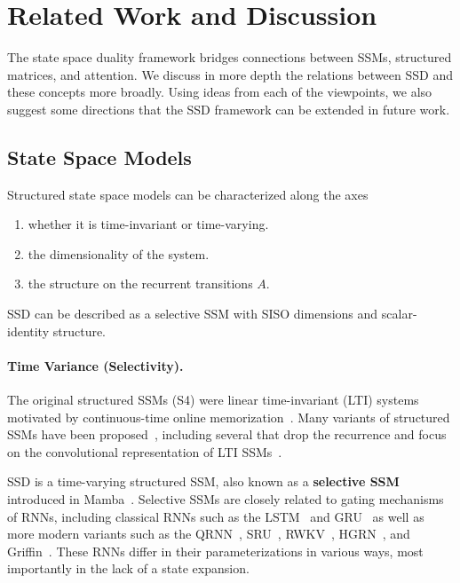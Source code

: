 \section{Related Work and Discussion}
\label{sec:related}


The state space duality framework bridges connections between SSMs, structured matrices, and attention.
We discuss in more depth the relations between SSD and these concepts more broadly.
Using ideas from each of the viewpoints, we also suggest some directions that the SSD framework can be extended in future work.

\subsection{State Space Models}
\label{sec:related:ssm}

Structured state space models can be characterized along the axes
\begin{enumerate}[label=(\roman*)]
  \item whether it is time-invariant or time-varying.
  \item the dimensionality of the system.
  \item the structure on the recurrent transitions $A$.
\end{enumerate}
SSD can be described as a selective SSM with SISO dimensions and scalar-identity structure.

\paragraph{Time Variance (Selectivity).}
The original structured SSMs (S4) were linear time-invariant (LTI) systems~\citep{gu2023thesis,gu2022efficiently} motivated by continuous-time online memorization~\citep{gu2020hippo,gu2021combining,gu2023train}.
Many variants of structured SSMs have been proposed~\citep{gupta2022diagonal,gu2022parameterization,smith2023s5,ma2023mega,dao2023hungry}, including several that drop the recurrence and focus on the convolutional representation of LTI SSMs~\citep{li2023makes,poli2023hyena,fu2023simple,qin2023toeplitz}.

SSD is a time-varying structured SSM, also known as a \textbf{selective SSM} introduced in Mamba~\citep{gu2023mamba}.
Selective SSMs are closely related to gating mechanisms of RNNs, including classical RNNs such as the LSTM~\citep{lstm} and GRU~\citep{chung2014empirical} as well as more modern variants such as the QRNN~\citep{bradbury2016quasi}, SRU~\citep{lei2017simple,lei2021attention}, RWKV~\citep{peng2023rwkv}, HGRN~\citep{qin2023hierarchically}, and Griffin~\citep{de2024griffin,botev2024recurrentgemma}.
These RNNs differ in their parameterizations in various ways, most importantly in the lack of a state expansion.

